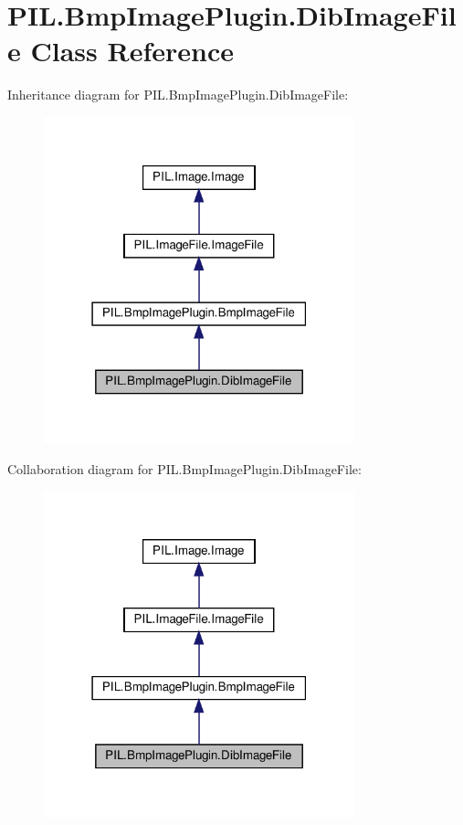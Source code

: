 \hypertarget{classPIL_1_1BmpImagePlugin_1_1DibImageFile}{}\section{P\+I\+L.\+Bmp\+Image\+Plugin.\+Dib\+Image\+File Class Reference}
\label{classPIL_1_1BmpImagePlugin_1_1DibImageFile}


Inheritance diagram for P\+I\+L.\+Bmp\+Image\+Plugin.\+Dib\+Image\+File\+:
\nopagebreak
\begin{figure}[H]
\begin{center}
\leavevmode
\includegraphics[width=255pt]{classPIL_1_1BmpImagePlugin_1_1DibImageFile__inherit__graph}
\end{center}
\end{figure}


Collaboration diagram for P\+I\+L.\+Bmp\+Image\+Plugin.\+Dib\+Image\+File\+:
\nopagebreak
\begin{figure}[H]
\begin{center}
\leavevmode
\includegraphics[width=255pt]{classPIL_1_1BmpImagePlugin_1_1DibImageFile__coll__graph}
\end{center}
\end{figure}
